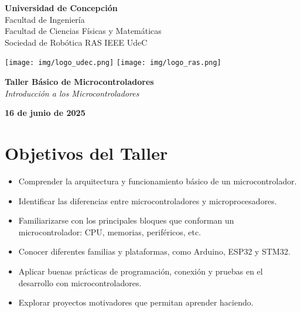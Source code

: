 \documentclass[a4paper,11pt]{article}
\begin{document}
\setlength{\parindent}{0pt}
\linespread{1.15}

\begin{titlepage}
  \begin{minipage}{0.48\textwidth}
    \raggedright
    {\Large\textbf{Universidad de Concepci\'on}}\\[0.2cm]
    {\normalsize Facultad de Ingenier\'ia}\\
    {\normalsize Facultad de Ciencias F\'isicas y Matem\'aticas}\\
    {\normalsize Sociedad de Rob\'otica RAS IEEE UdeC}
  \end{minipage}
  \hfill
  \begin{minipage}{0.48\textwidth}
    \raggedleft
    \texttt{[image: img/logo\_udec.png]}
    \hspace{0.5cm}
    \texttt{[image: img/logo\_ras.png]}
  \end{minipage}

  \vspace*{8cm}
  \centering

  {\Huge\bfseries\color{rosafuerte} Taller B\'asico de Microcontroladores}\\[1.2cm]
  {\LARGE \textit{Introducci\'on a los Microcontroladores}}\\[2cm]

  \vfill

  {\textbf{16 de junio de 2025}}

  \vspace*{1.5cm}
\end{titlepage}

\tableofcontents
\newpage

\section*{Objetivos del Taller}

\begin{itemize}
  \item Comprender la arquitectura y funcionamiento básico de un microcontrolador.
  \item Identificar las diferencias entre microcontroladores y microprocesadores.
  \item Familiarizarse con los principales bloques que conforman un microcontrolador: CPU, memorias, periféricos, etc.
  \item Conocer diferentes familias y plataformas, como Arduino, ESP32 y STM32.
  \item Aplicar buenas prácticas de programación, conexión y pruebas en el desarrollo con microcontroladores.
  \item Explorar proyectos motivadores que permitan aprender haciendo.
\end{itemize}
\end{document}
